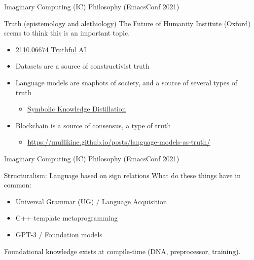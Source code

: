 \documentclass[presentation]{beamer}
\begin{document}
\begin{frame}[label={sec:org407df53}]{Imaginary Computing (IC) Philosophy (EmacsConf 2021)}
\begin{block}{Truth (epistemology and alethiology)}
The Future of Humanity Institute (Oxford)
seems to think this is an important topic.

\begin{itemize}
\item \href{https://arxiv.org/abs/2110.06674}{ 2110.06674  Truthful AI}
\item Datasets are a source of constructivist truth
\item Language models are snaphots of society, and a source of several types of truth
\begin{itemize}
\item \href{https://www.youtube.com/watch?v=kP-dXK9JEhY}{Symbolic Knowledge Distillation}
\end{itemize}
\item Blockchain is a source of consensus, a type of truth
\begin{itemize}
\item \url{https://mullikine.github.io/posts/language-models-as-truth/}
\end{itemize}
\end{itemize}
\end{block}
\end{frame}

\begin{frame}[label={sec:org7ed1313}]{Imaginary Computing (IC) Philosophy (EmacsConf 2021)}
\begin{block}{Structuralism: Language based on sign relations}
What do these things have in common:
\begin{itemize}
\item Universal Grammar (UG) / Language Acquisition
\item C++ template metaprogramming
\item GPT-3 / Foundation models
\end{itemize}

Foundational knowledge exists at compile-time
(DNA, preprocessor, training).
\end{block}
\end{frame}
\end{document}
